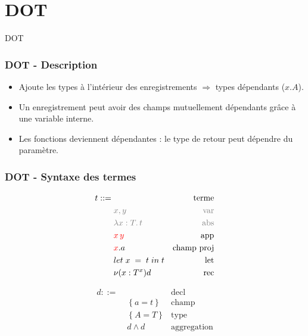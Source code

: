 \documentclass{beamer}
\newcommand{\lambdaExpr}[2]{\lambda #1 . \, #2}
\newcommand{\localLetBinding}[3]{let \; #1 \; = \; #2 \; in \; #3}
\begin{document}
\section{DOT}

\begin{frame}
	\begin{center}
		\Huge{DOT}
	\end{center}
\end{frame}

\begin{frame}
  \frametitle{DOT - Description}
  \begin{itemize}
  \item Ajoute les types à l'intérieur des enregistrements $\Rightarrow$ types
    dépendants ($x.A$).
  \item Un enregistrement peut avoir des champs mutuellement dépendants grâce à
    une variable interne.
  \item Les fonctions deviennent dépendantes : le type de retour peut dépendre
    du paramètre.
  \end{itemize}
\end{frame}

\begin{frame}
  \frametitle{DOT - Syntaxe des termes}
  \begin{minipage}{0.45\textwidth}
    \begin{align*}
      t ::= & \, & \text{terme} \\
            & \; {\color{gray}x, y} & {\color{gray}\text{var}} \\
            & \; {\color{gray}\lambdaExpr{x : T}{t}} & {\color{gray}\text{abs}} \\
            & \; {\color{red}x \, y} & \text{app} \\
            & \; {\color{red}x}.a & \text{champ proj} \\
            & \; \localLetBinding{x}{t}{t} & \text{let} \\
            & \; \nu(x : T^{x})d & \text{rec} \\
    \end{align*}
  \end{minipage}
  \begin{minipage}{0.45\textwidth}
    \begin{align*}
      d ::= & \, & \text{decl} \\
            & \; \left\{ a = t \right\} & \text{champ} \\
            & \; \left\{ A = T \right\} & \text{type} \\
            & \; d \wedge d & \text{aggregation}
    \end{align*}
  \end{minipage}
\end{frame} 
\end{document}
